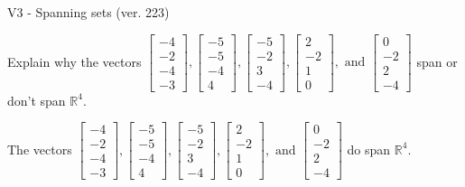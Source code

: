 \begin{exercise}
  \begin{exerciseTitle}V3 - Spanning sets (ver. 223)\end{exerciseTitle}
  \begin{exerciseStatement}
    Explain why the vectors \(\left[\begin{array}{r}
-4 \\
-2 \\
-4 \\
-3
\end{array}\right] , \left[\begin{array}{r}
-5 \\
-5 \\
-4 \\
4
\end{array}\right] , \left[\begin{array}{r}
-5 \\
-2 \\
3 \\
-4
\end{array}\right] , \left[\begin{array}{r}
2 \\
-2 \\
1 \\
0
\end{array}\right] , \text{ and } \left[\begin{array}{r}
0 \\
-2 \\
2 \\
-4
\end{array}\right]\) span or don't span \(\mathbb{R}^4\). 
	


  \end{exerciseStatement}
  \begin{exerciseAnswer}
   The vectors \(\left[\begin{array}{r}
-4 \\
-2 \\
-4 \\
-3
\end{array}\right] , \left[\begin{array}{r}
-5 \\
-5 \\
-4 \\
4
\end{array}\right] , \left[\begin{array}{r}
-5 \\
-2 \\
3 \\
-4
\end{array}\right] , \left[\begin{array}{r}
2 \\
-2 \\
1 \\
0
\end{array}\right] , \text{ and } \left[\begin{array}{r}
0 \\
-2 \\
2 \\
-4
\end{array}\right]\) 
  	 do  
	span \(\mathbb{R}^4\).
  



\end{exerciseAnswer}
\end{exercise}

